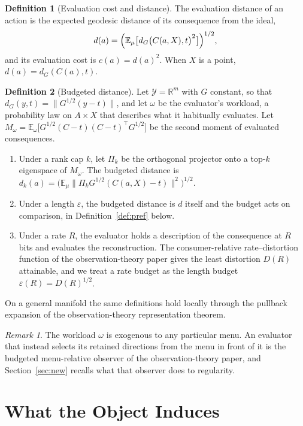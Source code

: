 \documentclass[11pt]{article}
\theoremstyle{definition}
\newtheorem{definition}{Definition}
\theoremstyle{remark}
\newtheorem*{remark}{Remark}
\newcommand{\Y}{\mathcal{Y}}
\newcommand{\Ex}{\mathbb{E}}
\newcommand{\R}{\mathbb{R}}
\newcommand{\dG}{d_{G}}
\begin{document}
\begin{definition}[Evaluation cost and distance]
\label{def:cost}
The evaluation distance of an action is the expected geodesic distance of its consequence from the ideal,
\[
d(a)=\Bigl(\Ex_{\mu}\bigl[\dG\bigl(C(a,X),t\bigr)^{2}\bigr]\Bigr)^{1/2},
\]
and its evaluation cost is $c(a)=d(a)^{2}$.
When $X$ is a point, $d(a)=\dG(C(a),t)$.
\end{definition}

\begin{definition}[Budgeted distance]
\label{def:budget}
Let $\Y=\R^{m}$ with $G$ constant, so that $\dG(y,t)=\|G^{1/2}(y-t)\|$, and let $\omega$ be the evaluator's workload, a probability law on $A\times X$ that describes what it habitually evaluates.
Let $M_{\omega}=\Ex_{\omega}\bigl[G^{1/2}(C-t)(C-t)^{\top}G^{1/2}\bigr]$ be the second moment of evaluated consequences.
\begin{enumerate}
\item[(i)] Under a rank cap $k$, let $\Pi_{k}$ be the orthogonal projector onto a top-$k$ eigenspace of $M_{\omega}$. The budgeted distance is $d_{k}(a)=\bigl(\Ex_{\mu}\|\Pi_{k}G^{1/2}(C(a,X)-t)\|^{2}\bigr)^{1/2}$.
\item[(ii)] Under a length $\varepsilon$, the budgeted distance is $d$ itself and the budget acts on comparison, in Definition~\ref{def:pref} below.
\item[(iii)] Under a rate $R$, the evaluator holds a description of the consequence at $R$ bits and evaluates the reconstruction. The consumer-relative rate--distortion function of the observation-theory paper gives the least distortion $D(R)$ attainable, and we treat a rate budget as the length budget $\varepsilon(R)=D(R)^{1/2}$.
\end{enumerate}
On a general manifold the same definitions hold locally through the pullback expansion of the observation-theory representation theorem.
\end{definition}

\begin{remark}
The workload $\omega$ is exogenous to any particular menu.
An evaluator that instead selects its retained directions from the menu in front of it is the budgeted menu-relative observer of the observation-theory paper, and Section~\ref{sec:new} recalls what that observer does to regularity.
\end{remark}

\section{What the Object Induces}
\label{sec:derive}
\end{document}
